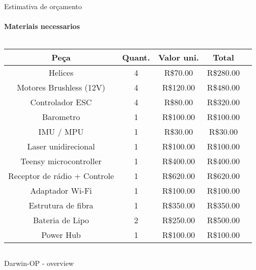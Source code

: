 \begin{frame}[t]{Estimativa de orçamento}
    \transboxout[duration=0.5]
    \framesubtitle{Materiais necessarios}
    \begin{columns}
         \centering
        \begin{tabular}{c | c | c | c | c}
                      Peça             & Quant. & Valor uni. & Total     &  \\ \hline
                    Helices            & 4      & R\$70.00   & R\$280.00 &  \\
            Motores Brushless (12V)    & 4      & R\$120.00  & R\$480.00 &  \\
                Controlador ESC        & 4      & R\$80.00   & R\$320.00 &  \\
                   Barometro           & 1      & R\$100.00  & R\$100.00 &  \\
                   IMU / MPU           & 1      & R\$30.00   & R\$30.00  &  \\
              Laser unidirecional      & 1      & R\$100.00  & R\$100.00 &  \\
             Teensy microcontroller    & 1      & R\$400.00  & R\$400.00 &  \\
          Receptor de rádio + Controle & 1      & R\$620.00  & R\$620.00 &  \\
                Adaptador Wi-Fi        & 1      & R\$100.00  & R\$100.00 &  \\
               Estrutura de fibra      & 1      & R\$350.00  & R\$350.00 &  \\
                Bateria de Lipo        & 2      & R\$250.00  & R\$500.00 &  \\
                   Power Hub           & 1      & R\$100.00  & R\$100.00 &
        \end{tabular}
    \end{columns}
\end{frame}
\begin{frame}[c]{Darwin-OP - overview}
    \centering


\end{frame}
